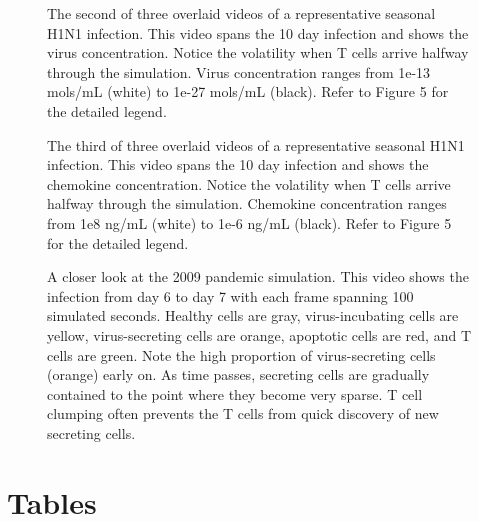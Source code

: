 \documentclass[10pt]{article}
\begin{document}
\begin{figure}[ht!]
\caption{The second of three overlaid videos of a representative seasonal H1N1 infection.  This video spans the 10 day infection and shows the virus concentration.  Notice the volatility when T cells arrive halfway through the simulation.  Virus concentration ranges from 1e-13 mols/mL (white) to 1e-27 mols/mL (black).  Refer to Figure 5 for the detailed legend. } 
 \label{video:virus_view}
\end{figure}

\begin{figure}[ht!]
\caption{The third of three overlaid videos of a representative seasonal H1N1 infection.  This video spans the 10 day infection and shows the chemokine concentration.  Notice the volatility when T cells arrive halfway through the simulation.  Chemokine concentration ranges from 1e8 ng/mL (white) to 1e-6 ng/mL (black).  Refer to Figure 5 for the detailed legend. } 
 \label{video:chemokine_view}
\end{figure}

\begin{figure}[ht!]
\caption{A closer look at the 2009 pandemic simulation.  This video shows the infection from day 6 to day 7 with each frame spanning 100 simulated seconds.  Healthy cells are gray, virus-incubating cells are yellow, virus-secreting cells are orange, apoptotic cells are red, and T cells are green.  Note the high proportion of virus-secreting cells (orange) early on.  As time passes, secreting cells are gradually contained to the point where they become very sparse.  T cell clumping often prevents the T cells from quick discovery of new secreting cells.}
\end{figure}

\pagebreak

\section*{Tables}
\end{document}

